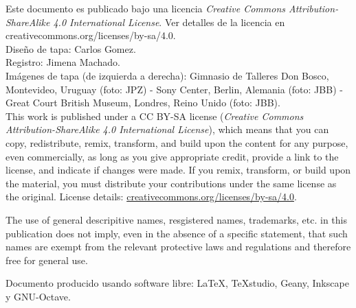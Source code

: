 \documentclass[spanish,twoside,openright,10pt]{book}
\theoremstyle{miestilo}
\begin{document}
\begin{small}

\noindent
Este documento es publicado bajo una licencia \textit{Creative Commons Attribution-ShareAlike 4.0 International License}. Ver detalles de la licencia en creativecommons.org/licenses/by-sa/4.0.\\

\noindent
Diseño de tapa: Carlos Gomez. \\
Registro: Jimena Machado.\\[1mm] %
Imágenes de tapa (de izquierda a derecha): Gimnasio de Talleres Don Bosco, Montevideo, Uruguay (foto: JPZ) - Sony Center, Berlin, Alemania (foto: JBB) - Great Court British Museum, Londres, Reino Unido (foto: JBB). \\

\noindent
This work is published under a CC BY-SA license (\textit{Creative Commons Attribution-ShareAlike 4.0 International License}), which means that you can copy, redistribute, remix, transform, and build upon the content for any purpose, even commercially, as long as you give appropriate credit, provide a link to the license, and indicate if changes were made. If you remix, transform, or build upon the material, you must distribute your contributions under the same license as the original. License details: \href{https://creativecommons.org/licenses/by-sa/4.0/}{creativecommons.org/licenses/by-sa/4.0}.

\vspace{2mm}

\noindent
The use of general descripitive names, resgistered names, trademarks, etc. in this publication does not imply, even in the absence of a specific statement, that such names are exempt from the relevant protective laws and regulations and therefore free for general use.

\end{small}

\vspace{3mm}

\noindent
\begin{footnotesize}
Documento producido usando software libre: \LaTeX, TeXstudio, Geany, Inkscape y GNU-Octave.
\end{footnotesize}



\thispagestyle{empty}

%
%
\end{document}
